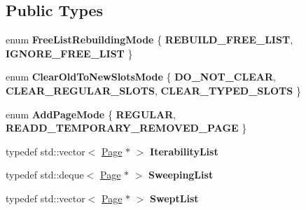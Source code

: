 \subsection*{Public Types}
\begin{DoxyCompactItemize}
\item 
\mbox{\label{classv8_1_1internal_1_1Sweeper_a4a6b2dc61081c50c8281e81d3b79d6e3}} 
enum {\bfseries Free\+List\+Rebuilding\+Mode} \{ {\bfseries R\+E\+B\+U\+I\+L\+D\+\_\+\+F\+R\+E\+E\+\_\+\+L\+I\+ST}, 
{\bfseries I\+G\+N\+O\+R\+E\+\_\+\+F\+R\+E\+E\+\_\+\+L\+I\+ST}
 \}
\item 
\mbox{\label{classv8_1_1internal_1_1Sweeper_ac05e24a8a3b4daad2ebb91d7e8c50071}} 
enum {\bfseries Clear\+Old\+To\+New\+Slots\+Mode} \{ {\bfseries D\+O\+\_\+\+N\+O\+T\+\_\+\+C\+L\+E\+AR}, 
{\bfseries C\+L\+E\+A\+R\+\_\+\+R\+E\+G\+U\+L\+A\+R\+\_\+\+S\+L\+O\+TS}, 
{\bfseries C\+L\+E\+A\+R\+\_\+\+T\+Y\+P\+E\+D\+\_\+\+S\+L\+O\+TS}
 \}
\item 
\mbox{\label{classv8_1_1internal_1_1Sweeper_a0ea5d975faaf1f212783c10bedbfb630}} 
enum {\bfseries Add\+Page\+Mode} \{ {\bfseries R\+E\+G\+U\+L\+AR}, 
{\bfseries R\+E\+A\+D\+D\+\_\+\+T\+E\+M\+P\+O\+R\+A\+R\+Y\+\_\+\+R\+E\+M\+O\+V\+E\+D\+\_\+\+P\+A\+GE}
 \}
\item 
\mbox{\label{classv8_1_1internal_1_1Sweeper_a1a6d90c28a334467088b96f74e764ba1}} 
typedef std\+::vector$<$ \mbox{\hyperlink{classv8_1_1internal_1_1Page}{Page}} $\ast$ $>$ {\bfseries Iterability\+List}
\item 
\mbox{\label{classv8_1_1internal_1_1Sweeper_a6dc9d681ce7d5f92110fb9483e3217c7}} 
typedef std\+::deque$<$ \mbox{\hyperlink{classv8_1_1internal_1_1Page}{Page}} $\ast$ $>$ {\bfseries Sweeping\+List}
\item 
\mbox{\label{classv8_1_1internal_1_1Sweeper_aa367afef3ebeaac28b6ce78cd235f047}} 
typedef std\+::vector$<$ \mbox{\hyperlink{classv8_1_1internal_1_1Page}{Page}} $\ast$ $>$ {\bfseries Swept\+List}
\end{DoxyCompactItemize}
